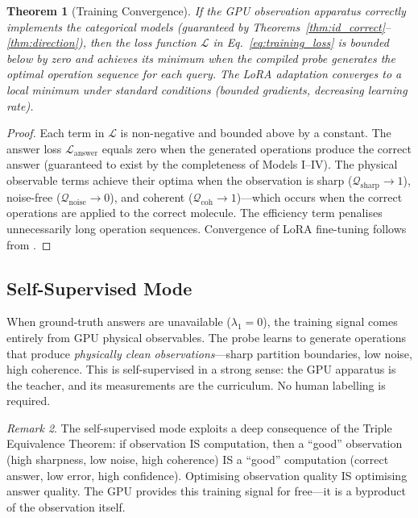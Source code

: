 \documentclass[11pt,twocolumn,a4paper]{article}
\newtheorem{theorem}{Theorem}[section]
\theoremstyle{definition}
\theoremstyle{remark}
\newtheorem{remark}[theorem]{Remark}
\newcommand{\Loss}{\mathcal{L}}
\begin{document}
\begin{theorem}[Training Convergence]
\label{thm:training_convergence}
If the GPU observation apparatus correctly implements the categorical models (guaranteed by Theorems~\ref{thm:id_correct}--\ref{thm:direction}), then the loss function $\Loss$ in Eq.~\eqref{eq:training_loss} is bounded below by zero and achieves its minimum when the compiled probe generates the optimal operation sequence for each query. The LoRA adaptation converges to a local minimum under standard conditions (bounded gradients, decreasing learning rate).
\end{theorem}

\begin{proof}
Each term in $\Loss$ is non-negative and bounded above by a constant. The answer loss $\Loss_{\mathrm{answer}}$ equals zero when the generated operations produce the correct answer (guaranteed to exist by the completeness of Models I--IV). The physical observable terms achieve their optima when the observation is sharp ($\mathcal{Q}_{\mathrm{sharp}} \to 1$), noise-free ($\mathcal{Q}_{\mathrm{noise}} \to 0$), and coherent ($\mathcal{Q}_{\mathrm{coh}} \to 1$)---which occurs when the correct operations are applied to the correct molecule. The efficiency term penalises unnecessarily long operation sequences. Convergence of LoRA fine-tuning follows from \citet{hu2022}.
\end{proof}

\subsection{Self-Supervised Mode}

When ground-truth answers are unavailable ($\lambda_1 = 0$), the training signal comes entirely from GPU physical observables. The probe learns to generate operations that produce \emph{physically clean observations}---sharp partition boundaries, low noise, high coherence. This is self-supervised in a strong sense: the GPU apparatus is the teacher, and its measurements are the curriculum. No human labelling is required.

\begin{remark}
The self-supervised mode exploits a deep consequence of the Triple Equivalence Theorem: if observation IS computation, then a ``good'' observation (high sharpness, low noise, high coherence) IS a ``good'' computation (correct answer, low error, high confidence). Optimising observation quality IS optimising answer quality. The GPU provides this training signal for free---it is a byproduct of the observation itself.
\end{remark}
\end{document}
